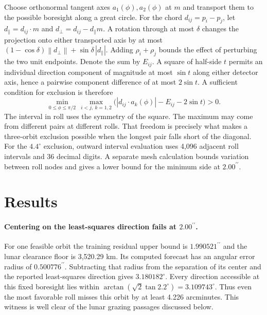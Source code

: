 \documentclass[10pt,letterpaper]{article}
\newcommand{\degc}{^{\circ}}
\newcommand{\as}{^{\prime\prime}}
\newcommand{\norm}[1]{\left\lVert #1\right\rVert}
\newcommand{\dotp}{\mathbin{\cdot}}
\begin{document}
Choose orthonormal tangent axes $a_1(\phi),a_2(\phi)$ at $m$ and transport them to the possible boresight along a great circle. For the chord $d_{ij}=p_i-p_j$, let $d_\parallel=d_{ij}\dotp m$ and $d_\perp=d_{ij}-d_\parallel m$. A rotation through at most $\delta$ changes the projection onto either transported axis by at most $(1-\cos\delta)\norm{d_\perp}+\sin\delta\,|d_\parallel|$. Adding $\rho_i+\rho_j$ bounds the effect of perturbing the two unit endpoints. Denote the sum by $E_{ij}$. A square of half-side $t$ permits an individual direction component of magnitude at most $\sin t$ along either detector axis, hence a pairwise component difference of at most $2\sin t$. A sufficient condition for exclusion is therefore
\begin{equation}
 \min_{0\leq\phi\leq\pi/2}\,
 \max_{i<j,\ k=1,2}\bigl(|d_{ij}\dotp a_k(\phi)|-E_{ij}-2\sin t\bigr)>0 .
 \label{eq:roll}
\end{equation}
The interval in roll uses the symmetry of the square. The maximum may come from different pairs at different rolls. That freedom is precisely what makes a three-orbit exclusion possible when the longest pair falls short of the diagonal. For the $4.4\degc$ exclusion, outward interval evaluation uses 4,096 adjacent roll intervals and 36 decimal digits. A separate mesh calculation bounds variation between roll nodes and gives a lower bound for the minimum side at $2.00\as$.

\section{Results}



\paragraph{Centering on the least-squares direction fails at $2.00\as$.}
For one feasible orbit the training residual upper bound is $1.990521\as$ and the lunar clearance floor is 3,520.29 km. Its computed forecast has an angular error radius of $0.500776\as$. Subtracting that radius from the separation of its center and the reported least-squares direction gives $3.180182\degc$. Every direction accessible at this fixed boresight lies within $\arctan(\sqrt{2}\tan 2.2\degc)=3.109743\degc$. Thus even the most favorable roll misses this orbit by at least 4.226 arcminutes. This witness is well clear of the lunar grazing passages discussed below.
\end{document}
